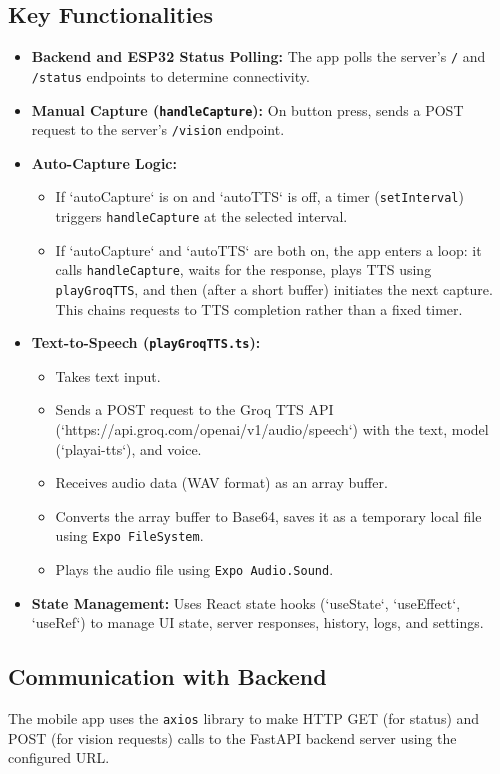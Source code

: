 \documentclass[12pt, a4paper]{report}
\begin{document}
\subsection{Key Functionalities}
\begin{itemize}
    \item \textbf{Backend and ESP32 Status Polling:} The app polls the server's \texttt{/} and \texttt{/status} endpoints to determine connectivity.
    \item \textbf{Manual Capture (\texttt{handleCapture}):} On button press, sends a POST request to the server's \texttt{/vision} endpoint.
    \item \textbf{Auto-Capture Logic:}
        \begin{itemize}
            \item If `autoCapture` is on and `autoTTS` is off, a timer (\texttt{setInterval}) triggers \texttt{handleCapture} at the selected interval.
            \item If `autoCapture` and `autoTTS` are both on, the app enters a loop: it calls \texttt{handleCapture}, waits for the response, plays TTS using \texttt{playGroqTTS}, and then (after a short buffer) initiates the next capture. This chains requests to TTS completion rather than a fixed timer.
        \end{itemize}
    \item \textbf{Text-to-Speech (\texttt{playGroqTTS.ts}):}
        \begin{itemize}
            \item Takes text input.
            \item Sends a POST request to the Groq TTS API (`https://api.groq.com/openai/v1/audio/speech`) with the text, model (`playai-tts`), and voice.
            \item Receives audio data (WAV format) as an array buffer.
            \item Converts the array buffer to Base64, saves it as a temporary local file using \texttt{Expo FileSystem}.
            \item Plays the audio file using \texttt{Expo Audio.Sound}.
        \end{itemize}
    \item \textbf{State Management:} Uses React state hooks (`useState`, `useEffect`, `useRef`) to manage UI state, server responses, history, logs, and settings.
\end{itemize}

\subsection{Communication with Backend}
The mobile app uses the \texttt{axios} library to make HTTP GET (for status) and POST (for vision requests) calls to the FastAPI backend server using the configured URL.
\end{document}
